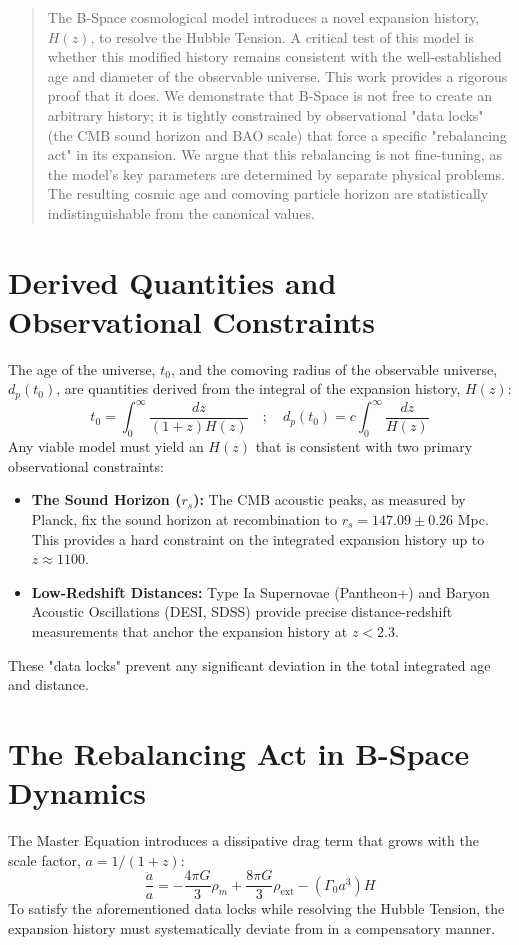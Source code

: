 \documentclass{BSpacePaper} %
\begin{document}
\makeBSCSsupplementtitle

\begin{abstract}
\noindent
The B-Space cosmological model introduces a novel expansion history, $H(z)$, to resolve the Hubble Tension. A critical test of this model is whether this modified history remains consistent with the well-established age and diameter of the observable universe. This work provides a rigorous proof that it does. We demonstrate that B-Space is not free to create an arbitrary history; it is tightly constrained by observational "data locks" (the CMB sound horizon and BAO scale) that force a specific "rebalancing act" in its expansion. We argue that this rebalancing is not fine-tuning, as the model's key parameters are determined by separate physical problems. The resulting cosmic age and comoving particle horizon are statistically indistinguishable from the canonical \lcdm{} values.
\end{abstract}

\section{Derived Quantities and Observational Constraints}
The age of the universe, $t_0$, and the comoving radius of the observable universe, $d_p(t_0)$, are quantities derived from the integral of the expansion history, $H(z)$:
\begin{equation}
    t_0 = \int_0^\infty \frac{dz}{(1+z)H(z)} \quad ; \quad d_p(t_0) = c \int_0^\infty \frac{dz}{H(z)}
\end{equation}
Any viable model must yield an $H(z)$ that is consistent with two primary observational constraints:
\begin{itemize}
    \item \textbf{The Sound Horizon ($r_s$):} The CMB acoustic peaks, as measured by Planck, fix the sound horizon at recombination to $r_s = 147.09 \pm 0.26$ Mpc. This provides a hard constraint on the integrated expansion history up to $z \approx 1100$.
    \item \textbf{Low-Redshift Distances:} Type Ia Supernovae (Pantheon+) and Baryon Acoustic Oscillations (DESI, SDSS) provide precise distance-redshift measurements that anchor the expansion history at $z < 2.3$.
\end{itemize}
These "data locks" prevent any significant deviation in the total integrated age and distance.

\section{The Rebalancing Act in B-Space Dynamics}
The \bspace{} Master Equation introduces a dissipative drag term that grows with the scale factor, $a = 1/(1+z)$:
\begin{equation}
    \frac{\ddot{a}}{a} = -\frac{4\pi G}{3}\rho_m + \frac{8\pi G}{3}\rho_{\text{ext}} - \left(\Gamma_0 a^3\right) H
\end{equation}
To satisfy the aforementioned data locks while resolving the Hubble Tension, the \bspace{} expansion history must systematically deviate from \lcdm{} in a compensatory manner.
\end{document}
